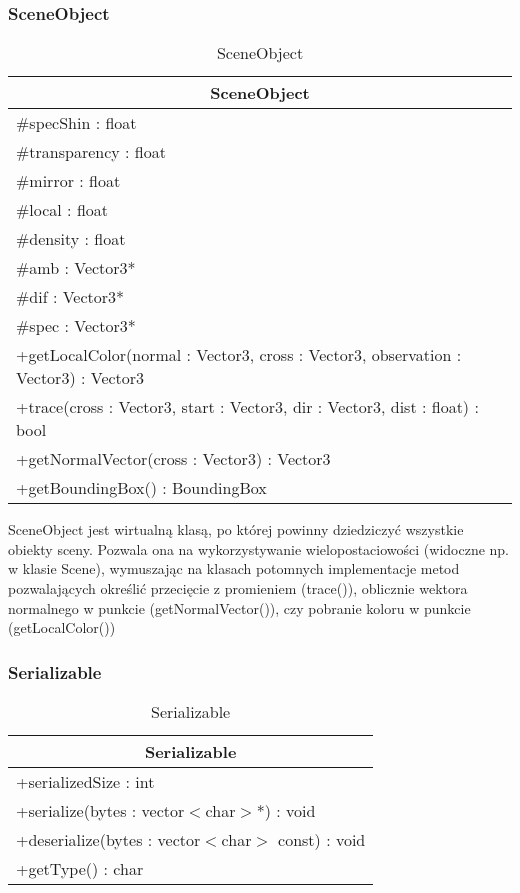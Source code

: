 \subsubsection{SceneObject}

\footnotesize
\begin{longtable}{|p{14cm}|}
    \caption{SceneObject} \label{tab:SceneObject} \\ \hline
    \multicolumn{1}{|c|}{SceneObject} \\ \hline
    \#specShin : float \\
    \#transparency : float \\
    \#mirror : float \\
    \#local : float \\
    \#density : float \\
    \#amb : Vector3* \\
    \#dif : Vector3* \\
    \#spec : Vector3* \\
    \hline
	+getLocalColor(normal : Vector3, cross : Vector3, observation : Vector3) : Vector3 \\
	+trace(cross : Vector3, start : Vector3, dir : Vector3, dist : float) : bool \\
	+getNormalVector(cross : Vector3) : Vector3 \\
	+getBoundingBox() : BoundingBox \\
	\hline
\end{longtable}
\normalsize

SceneObject jest wirtualną klasą, po której powinny dziedziczyć wszystkie obiekty sceny. Pozwala ona na wykorzystywanie wielopostaciowości (widoczne np. w klasie Scene), wymuszając na klasach potomnych implementacje metod pozwalających określić przecięcie z promieniem (trace()), oblicznie wektora normalnego w punkcie (getNormalVector()), czy pobranie koloru w punkcie (getLocalColor())

\subsubsection{Serializable}

\footnotesize
\begin{longtable}{|p{14cm}|}
    \caption{Serializable} \label{tab:Serializable} \\ \hline
    \multicolumn{1}{|c|}{Serializable} \\ \hline
    +serializedSize : int \\ \hline
	+serialize(bytes : vector$<$char$>$*) : void \\ 
	+deserialize(bytes : vector$<$char$>$ const) : void \\
	+getType() : char \\
	\hline
\end{longtable}
\normalsize

